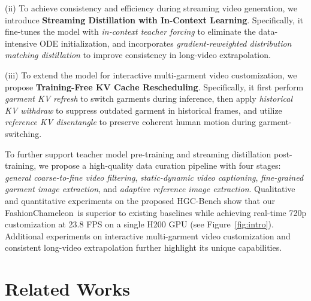 \documentclass{llmxive}
\providecommand{\method}{FashionChameleon\xspace}
\begin{document}
(ii) To achieve consistency and efficiency during streaming video generation, we introduce \textbf{Streaming Distillation with In-Context Learning}.
Specifically, it fine-tunes the model with \textit{in-context teacher forcing} to eliminate the data-intensive ODE initialization, and incorporates \textit{gradient-reweighted distribution matching distillation} to improve consistency in long-video extrapolation.





(iii) To extend the model for interactive multi-garment video customization, we propose \textbf{Training-Free KV Cache Rescheduling}.
Specifically, it first perform \textit{garment KV refresh} to switch garments during inference, then apply \textit{historical KV withdraw} to suppress outdated garment in historical frames, and utilize \textit{reference KV disentangle} to preserve coherent human motion during garment-switching.





To further support teacher model pre-training and streaming distillation post-training, we propose a high-quality data curation pipeline with four stages: \textit{general coarse-to-fine video filtering}, \textit{static-dynamic video captioning}, \textit{fine-grained garment image extraction}, and \textit{adaptive reference image extraction}.
% 
Qualitative and quantitative experiments on the proposed HGC-Bench show that our \method\ is superior to existing baselines while achieving real-time 720p customization at 23.8 FPS on a single H200 GPU (see Figure~\ref{fig:intro}). 
Additional experiments on interactive multi-garment video customization and consistent long-video extrapolation further highlight its unique capabilities.

\section{Related Works}
\end{document}
